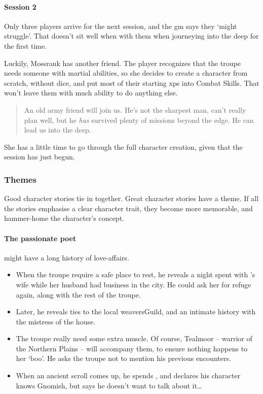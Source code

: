 \begin{multicols}{2}
\begin{exampletext}
\end{exampletext}

\begin{exampletext}
  \paragraph{Session 2}
  Only three players arrive for the next session, and the \gls{gm} says they `might struggle'.
  That doesn't sit well when with them when journeying into the \gls{deep} for the first time.

  Luckily, Mossrank has another friend.
  The player recognizes that the troupe needs someone with martial abilities, so she decides to create a character from scratch, without dice, and put most of their starting \glspl{xp} into Combat Skills.
  That won't leave them with much ability to do anything else.

  \begin{quotation}
    An old army friend will join us.
    He's not the sharpest man, can't really plan well, but he \emph{has} survived plenty of missions beyond the \gls{edge}.
    He can lead us into the \gls{deep}.
  \end{quotation}

  She has a little time to go through the full character creation, given that the session has just begun.
\end{exampletext}

\subsubsection{Themes}

Good character stories tie in together.
Great character stories have a theme.
If all the stories emphasise a clear character trait, they become more memorable, and hammer-home the character's concept.

\paragraph{The passionate poet}
might have a long history of love-affairs.

\begin{itemize}
  \item
  When the troupe require a safe place to rest, he reveals a night spent with 's wife while her husband had business in the city.
  He could ask her for refuge again, along with the rest of the troupe.
  \item
  Later, he reveals ties to the local \gls{weaversGuild}, and an intimate history with the mistress of the house.
  \item
  The troupe really need some extra muscle.
  Of course, Tealmoor -- warrior of the Northern Plains -- will accompany them, to ensure nothing happens to her `boo'.
  He asks the troupe not to mention his previous encounters.
  \item
  When an ancient scroll comes up, he spends , and declares his character knows Gnomish, but says he doesn't want to talk about it\ldots
\end{itemize}


\end{multicols}

